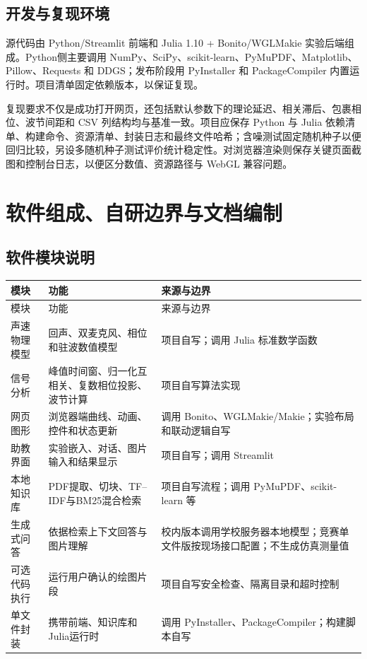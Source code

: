 \documentclass[UTF8,a4paper,zihao=-4]{ctexart}
\begin{document}
\subsection{开发与复现环境}
源代码由 Python/Streamlit 前端和 Julia 1.10 + Bonito/WGLMakie 实验后端组成。Python侧主要调用 NumPy、SciPy、scikit-learn、PyMuPDF、Matplotlib、Pillow、Requests 和 DDGS；发布阶段用 PyInstaller 和 PackageCompiler 内置运行时。项目清单固定依赖版本，以保证复现。

复现要求不仅是成功打开网页，还包括默认参数下的理论延迟、相关滞后、包裹相位、波节间距和 CSV 列结构均与基准一致。项目应保存 Python 与 Julia 依赖清单、构建命令、资源清单、封装日志和最终文件哈希；含噪测试固定随机种子以便回归比较，另设多随机种子测试评价统计稳定性。对浏览器渲染则保存关键页面截图和控制台日志，以便区分数值、资源路径与 WebGL 兼容问题。

\section{软件组成、自研边界与文档编制}

\subsection{软件模块说明}
\begin{longtable}{p{3.4cm}p{5.2cm}p{5.0cm}}
\toprule
模块 & 功能 & 来源与边界\\
\midrule
\endfirsthead
\toprule
模块 & 功能 & 来源与边界\\
\midrule
\endhead
声速物理模型 & 回声、双麦克风、相位和驻波数值模型 & 项目自写；调用 Julia 标准数学函数\\
信号分析 & 峰值时间窗、归一化互相关、复数相位投影、波节计算 & 项目自写算法实现\\
网页图形 & 浏览器端曲线、动画、控件和状态更新 & 调用 Bonito、WGLMakie/Makie；实验布局和联动逻辑自写\\
助教界面 & 实验嵌入、对话、图片输入和结果显示 & 项目自写；调用 Streamlit\\
本地知识库 & PDF提取、切块、TF--IDF与BM25混合检索 & 项目自写流程；调用 PyMuPDF、scikit-learn 等\\
生成式问答 & 依据检索上下文回答与图片理解 & 校内版本调用学校服务器本地模型；竞赛单文件版按现场接口配置；不生成仿真测量值\\
可选代码执行 & 运行用户确认的绘图片段 & 项目自写安全检查、隔离目录和超时控制\\
单文件封装 & 携带前端、知识库和Julia运行时 & 调用 PyInstaller、PackageCompiler；构建脚本自写\\
\bottomrule
\end{longtable}
\end{document}
